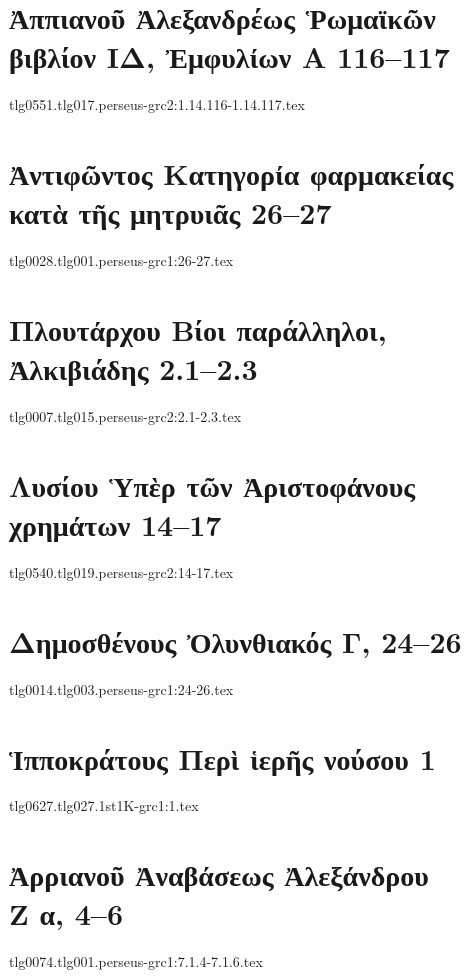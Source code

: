 \documentclass[a4paper,12pt,twoside]{report}
\begin{document}
\chapter[Ἀππιανοῦ Ῥωμαϊκῶν ΙΔ]{\textgreek[variant=ancient]{Ἀππιανοῦ Ἀλεξανδρέως Ῥωμαϊκῶν \\βιβλίον ΙΔ, Ἐμφυλίων Α} 116–117}
{tlg0551.tlg017.perseus-grc2:1.14.116-1.14.117.tex}

\chapter[Ἀντιφῶντος Κατηγορία φαρμακείας\dots]{\textgreek[variant=ancient]{Ἀντιφῶντος Κατηγορία φαρμακείας κατὰ τῆς μητρυιᾶς} 26–27}
{tlg0028.tlg001.perseus-grc1:26-27.tex}

\chapter[Πλουτάρχου Ἀλκιβιάδης]{\textgreek[variant=ancient]{Πλουτάρχου Βίοι παράλληλοι, \\Ἀλκιβιάδης} 2.1–2.3}
{tlg0007.tlg015.perseus-grc2:2.1-2.3.tex}

\chapter[Λυσίου Ὑπὲρ τῶν Ἀριστοφάνους χρημάτων]{\textgreek[variant=ancient]{Λυσίου Ὑπὲρ τῶν Ἀριστοφάνους χρημάτων} 14–17}
{tlg0540.tlg019.perseus-grc2:14-17.tex}


\chapter[Δημοσθένους Ὀλυνθιακός Γ]{\textgreek[variant=ancient]{Δημοσθένους Ὀλυνθιακός Γ,} 24–26}
{tlg0014.tlg003.perseus-grc1:24-26.tex}

\chapter[Ἱπποκράτους Περὶ ἱερῆς νούσου]{\textgreek[variant=ancient]{Ἱπποκράτους Περὶ ἱερῆς νούσου} 1}
{tlg0627.tlg027.1st1K-grc1:1.tex}

\chapter[Ἀρριανοῦ Ἀναβάσεως Ἀλεξάνδρου Ζ]{\textgreek[variant=ancient]{Ἀρριανοῦ Ἀναβάσεως Ἀλεξάνδρου \\Ζ α,} 4–6}
{tlg0074.tlg001.perseus-grc1:7.1.4-7.1.6.tex}
\end{document}
